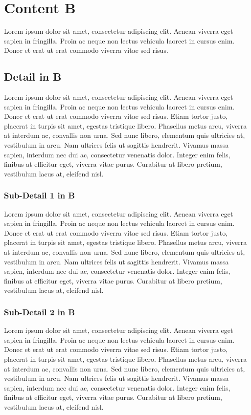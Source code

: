 
\chapter{Content B}

Lorem ipsum dolor sit amet, consectetur adipiscing elit. Aenean viverra eget sapien in fringilla. Proin ac neque non lectus vehicula laoreet in cursus enim. Donec et erat ut erat commodo viverra vitae sed risus.

\section{Detail in B}

Lorem ipsum dolor sit amet, consectetur adipiscing elit. Aenean viverra eget sapien in fringilla. Proin ac neque non lectus vehicula laoreet in cursus enim. Donec et erat ut erat commodo viverra vitae sed risus. Etiam tortor justo, placerat in turpis sit amet, egestas tristique libero. Phasellus metus arcu, viverra at interdum ac, convallis non urna. Sed nunc libero, elementum quis ultricies at, vestibulum in arcu. Nam ultrices felis ut sagittis hendrerit. Vivamus massa sapien, interdum nec dui ac, consectetur venenatis dolor. Integer enim felis, finibus at efficitur eget, viverra vitae purus. Curabitur at libero pretium, vestibulum lacus at, eleifend nisl.

\subsection{Sub-Detail 1 in B}
Lorem ipsum dolor sit amet, consectetur adipiscing elit. Aenean viverra eget sapien in fringilla. Proin ac neque non lectus vehicula laoreet in cursus enim. Donec et erat ut erat commodo viverra vitae sed risus. Etiam tortor justo, placerat in turpis sit amet, egestas tristique libero. Phasellus metus arcu, viverra at interdum ac, convallis non urna. Sed nunc libero, elementum quis ultricies at, vestibulum in arcu. Nam ultrices felis ut sagittis hendrerit. Vivamus massa sapien, interdum nec dui ac, consectetur venenatis dolor. Integer enim felis, finibus at efficitur eget, viverra vitae purus. Curabitur at libero pretium, vestibulum lacus at, eleifend nisl.
\subsection{Sub-Detail 2 in B}
Lorem ipsum dolor sit amet, consectetur adipiscing elit. Aenean viverra eget sapien in fringilla. Proin ac neque non lectus vehicula laoreet in cursus enim. Donec et erat ut erat commodo viverra vitae sed risus. Etiam tortor justo, placerat in turpis sit amet, egestas tristique libero. Phasellus metus arcu, viverra at interdum ac, convallis non urna. Sed nunc libero, elementum quis ultricies at, vestibulum in arcu. Nam ultrices felis ut sagittis hendrerit. Vivamus massa sapien, interdum nec dui ac, consectetur venenatis dolor. Integer enim felis, finibus at efficitur eget, viverra vitae purus. Curabitur at libero pretium, vestibulum lacus at, eleifend nisl.
